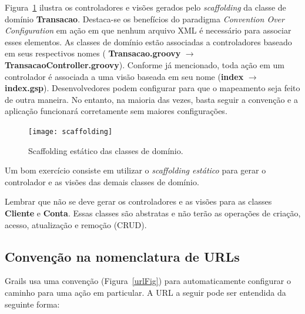 \newpage

Figura~\ref{scaffoldingFig} ilustra os controladores  e visões gerados pelo {\it
  scaffolding} da  classe de domínio {\bf Transacao}.   Destaca-se os benefícios
do paradigma {\it  Convention Over Configuration} em ação  em que nenhum arquivo
XML  é necessário para  associar esses  elementos. As  classes de  domínio estão
associadas   a   controladores  baseado   em   seus   respectivos  nomes   ({\bf
  Transacao.groovy}  $\rightarrow$ {\bf  TransacaoController.groovy}).  Conforme
já mencionado,  toda ação em um controlador  é associada a uma  visão baseada em
seu  nome ({\bf  index} $\rightarrow$  {\bf index.gsp}).   Desenvolvedores podem
configurar para  que o mapeamento seja  feito de outra maneira.   No entanto, na
maioria  das  vezes,   basta  seguir  a  convenção  e   a  aplicação  funcionará
corretamente      sem     maiores      configurações.      

\vspace{0.5cm}

\begin{figure}[htbp]
\centering\texttt{[image: scaffolding]}
\caption{Scaffolding estático das classes de domínio.}
\label{scaffoldingFig}
\end{figure}

\begin{remark}
Um bom exercício consiste em utilizar  o {\it scaffolding estático} para gerar o
controlador e as visões das demais classes de domínio.
\end{remark}

\begin{cBox}
Lembrar que não se deve gerar os  controladores e as visões para as classes {\bf
  Cliente} e {\bf Conta}.  Essas classes  são abstratas e não terão as operações
de criação, acesso, atualização e remoção (CRUD).  
\end{cBox}

\vspace{0.2cm}

\newpage

\subsection{Convenção na nomenclatura de URLs}\label{secURL}

\vspace{0.5cm}

Grails usa uma convenção (Figura~\ref{urlFig}) para automaticamente configurar o
caminho  para uma  ação em  particular. A  URL a  seguir pode  ser  entendida da
seguinte forma:

